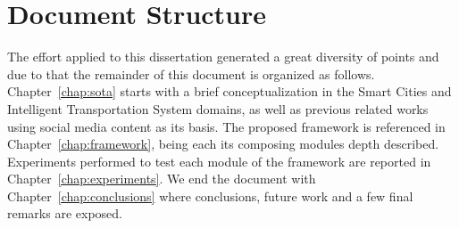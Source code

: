 


\section{Document Structure}\label{sec:doc_structure}
The effort applied to this dissertation generated a great diversity of points and due to that the remainder of this document is organized as follows.
Chapter~\ref{chap:sota} starts with a brief conceptualization in the Smart Cities and Intelligent Transportation System domains, as well as previous related works using social media content as its basis.
The proposed framework is referenced in Chapter~\ref{chap:framework}, being each its composing modules depth described.
Experiments performed to test each module of the framework are reported in Chapter~\ref{chap:experiments}.
We end the document with Chapter~\ref{chap:conclusions} where conclusions, future work and a few final remarks are exposed.